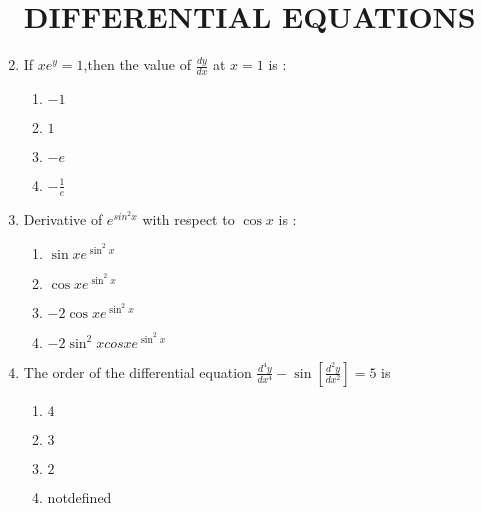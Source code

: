 \documentclass{article}
\begin{document}
				\begin{enumerate}
						\section{DIFFERENTIAL EQUATIONS}
						    \item If $xe^{y}=1$,then the value of $\frac{dy}{dx}$ at $x = 1$ is :
                \begin{enumerate}[label=(\Alph*)]
                        \item $-1$
                        \item $1$
                        \item $-e$
                        \item $-\frac{1}{e}$
                \end{enumerate}
                        \item Derivative of $e^{sin^2x}$ with respect to $\cos x$ is :
                                \begin{enumerate}[label=(\Alph*)]
                                        \item $\sin x  e^{\sin^2x}$
                                        \item $\cos x  e^{\sin^2x}$
                                        \item $-2\cos x e^{\sin^2x}$
                                        \item $-2\sin^2 x cos x  e^{\sin^2x}$
                                \end{enumerate}
                        \item The order of the differential equation $\frac{d^4y}{dx^4} - \sin[\frac{d^2y}{dx^2}]=5$ is
                                \begin{enumerate}[label=(\Alph*)]

                                        \item $4$
                                        \item $3$
                                        \item $2$
                                        \item notdefined
				\end{enumerate}
				\end{enumerate}
				
\end{document}
